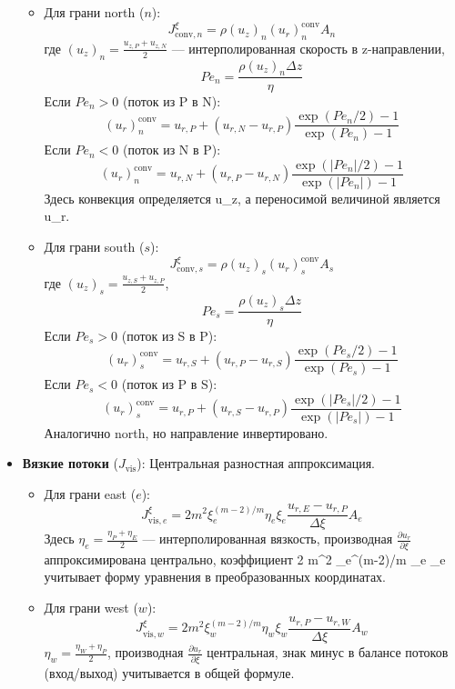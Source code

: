 \documentclass[a4paper,12pt]{article}
\begin{document}
\begin{itemize}
\begin{itemize}
        \item Для грани north (\(n\)):
        \[
        J_{\text{conv},n}^\xi = \rho (u_z)_n (u_r)_n^{\text{conv}} A_n
        \]
        где \((u_z)_n = \frac{u_{z,P} + u_{z,N}}{2}\) — интерполированная скорость в z-направлении,
        \[
        Pe_n = \frac{\rho (u_z)_n \Delta z}{\eta}
        \]
        Если \(Pe_n > 0\) (поток из P в N):
        \[
        (u_r)_n^{\text{conv}} = u_{r,P} + (u_{r,N} - u_{r,P}) \frac{\exp(Pe_n / 2) - 1}{\exp(Pe_n) - 1}
        \]
        Если \(Pe_n < 0\) (поток из N в P):
        \[
        (u_r)_n^{\text{conv}} = u_{r,N} + (u_{r,P} - u_{r,N}) \frac{\exp(|Pe_n| / 2) - 1}{\exp(|Pe_n|) - 1}
        \]
        Здесь конвекция определяется u_z, а переносимой величиной является u_r.

        \item Для грани south (\(s\)):
        \[
        J_{\text{conv},s}^\xi = \rho (u_z)_s (u_r)_s^{\text{conv}} A_s
        \]
        где \((u_z)_s = \frac{u_{z,S} + u_{z,P}}{2}\),
        \[
        Pe_s = \frac{\rho (u_z)_s \Delta z}{\eta}
        \]
        Если \(Pe_s > 0\) (поток из S в P):
        \[
        (u_r)_s^{\text{conv}} = u_{r,S} + (u_{r,P} - u_{r,S}) \frac{\exp(Pe_s / 2) - 1}{\exp(Pe_s) - 1}
        \]
        Если \(Pe_s < 0\) (поток из P в S):
        \[
        (u_r)_s^{\text{conv}} = u_{r,P} + (u_{r,S} - u_{r,P}) \frac{\exp(|Pe_s| / 2) - 1}{\exp(|Pe_s|) - 1}
        \]
        Аналогично north, но направление инвертировано.
    \end{itemize}
    \item \textbf{Вязкие потоки} (\(J_{\text{vis}}\)): Центральная разностная аппроксимация.
    \begin{itemize}
        \item Для грани east (\(e\)):
        \[
        J_{\text{vis},e}^\xi = 2 m^2 \xi_e^{(m-2)/m} \eta_e \xi_e \frac{u_{r,E} - u_{r,P}}{\Delta \xi} A_e
        \]
        Здесь \(\eta_e = \frac{\eta_P + \eta_E}{2}\) — интерполированная вязкость, производная \(\frac{\partial u_r}{\partial \xi}\) аппроксимирована центрально, коэффициент 2 m^2 \xi_e^{(m-2)/m} \eta_e \xi_e учитывает форму уравнения в преобразованных координатах.

        \item Для грани west (\(w\)):
        \[
        J_{\text{vis},w}^\xi = 2 m^2 \xi_w^{(m-2)/m} \eta_w \xi_w \frac{u_{r,P} - u_{r,W}}{\Delta \xi} A_w
        \]
        \(\eta_w = \frac{\eta_W + \eta_P}{2}\), производная \(\frac{\partial u_r}{\partial \xi}\) центральная, знак минус в балансе потоков (вход/выход) учитывается в общей формуле.


\end{itemize}
\end{itemize}
\end{document}
